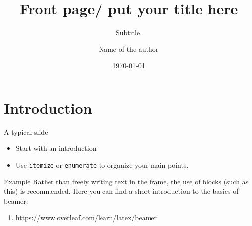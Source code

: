 \documentclass[aspectratio=169]{beamer}
\title[Your Short Title]{Front page/ put your title here}
\subtitle{Subtitle.}
\author{Name of the author}
\date{\today}
\begin{document}
	\maketitle
	\tableofcontents

	\section{Introduction}
	\begin{frame}{A typical slide}
		\begin{itemize}
			\item Start with an introduction
			\item Use \texttt{itemize} or \texttt{enumerate} to organize your main points.
		\end{itemize}
		\begin{block}{Example}
			Rather than freely writing text in the frame, the use of blocks (such as this) is recommended.
			Here you can find a short introduction to the basics of beamer:
			\begin{enumerate}
				\item https://www.overleaf.com/learn/latex/beamer
			\end{enumerate}
		\end{block}
	\end{frame}
\end{document}
